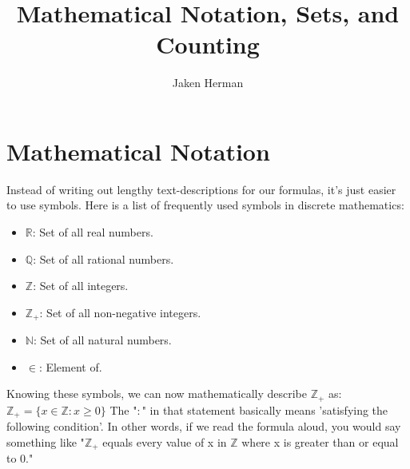 \documentclass[10pt,a4paper]{article}
\author{Jaken Herman}
\title{Mathematical Notation, Sets, and Counting}
\begin{document}
\maketitle

\section{Mathematical Notation}
Instead of writing out lengthy text-descriptions for our formulas, it's just easier to use symbols. Here is a list of frequently used symbols in discrete mathematics:
\begin{itemize}
\item $\mathbb{R}$: Set of all real numbers.
\item $\mathbb{Q}$: Set of all rational numbers.
\item $\mathbb{Z}$: Set of all integers.
\item $\mathbb{Z_+}$: Set of all non-negative integers.
\item $\mathbb{N}$: Set of all natural numbers.
\item $\in$: Element of.
\end{itemize}

Knowing these symbols, we can now mathematically describe $\mathbb{Z_+}$ as:
\linebreak \center $\mathbb{Z_+} = \{ x \in \mathbb{Z} : x \geq 0 \}$
\linebreak
\linebreak
The "$:$" in that statement basically means 'satisfying the following condition'. In other words, if we read the formula aloud, you would say something like "$\mathbb{Z_+}$ equals every value of x in $\mathbb{Z}$ where x is greater than or equal to 0."
\end{document}
